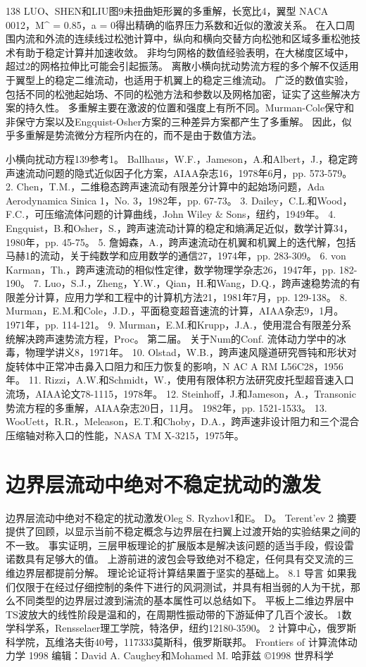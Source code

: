 \documentclass[UTF8,11pt,a4paper,openany,fontset=fandol]{ctexbook}
\begin{document}
138 LUO、SHEN和LIU图9未扭曲矩形翼的多重解，长宽比4，翼型 NACA 0012，M\textasciicircum{} = 0.85，a = 0得出精确的临界压力系数和近似的激波关系。 在入口周围内流和外流的连续线过松弛计算中，纵向和横向交替方向松弛和区域多重松弛技术有助于稳定计算并加速收敛。 非均匀网格的数值经验表明，在大梯度区域中，超过2的网格拉伸比可能会引起振荡。 离散小横向扰动势流方程的多个解不仅适用于翼型上的稳定二维流动，也适用于机翼上的稳定三维流动。 广泛的数值实验，包括不同的松弛起始场、不同的松弛方法和参数以及网格加密，证实了这些解决方案的持久性。 多重解主要在激波的位置和强度上有所不同。Murman-Cole保守和非保守方案以及Engquist-Osher方案的三种差异方案都产生了多重解。 因此，似乎多重解是势流微分方程所内在的，而不是由于数值方法。

小横向扰动方程139参考1。 Ballhaus，W.F.，Jameson，A.和Albert，J.，稳定跨声速流动问题的隐式近似因子化方案，AIAA杂志16，1978年6月，pp. 573-579。 2. Chen，T.M.，二维稳态跨声速流动有限差分计算中的起始场问题，Ada Aerodynamica Sinica 1，No. 3，1982年，pp. 67-73。 3. Dailey，C.L.和Wood，F.C.，可压缩流体问题的计算曲线，John Wiley \& Sons，纽约，1949年。 4. Engquist，B.和Osher，S.，跨声速流动计算的稳定和熵满足近似，数学计算34，1980年，pp. 45-75。 5. 詹姆森，A.，跨声速流动在机翼和机翼上的迭代解，包括马赫1的流动，关于纯数学和应用数学的通信27，1974年，pp. 283-309。 6. von Karman，Th.，跨声速流动的相似性定律，数学物理学杂志26，1947年，pp. 182-190。 7. Luo，S.J.，Zheng，Y.W.，Qian，H.和Wang，D.Q.，跨声速稳势流的有限差分计算，应用力学和工程中的计算机方法21，1981年7月，pp. 129-138。 8. Murman，E.M.和Cole，J.D.，平面稳变超音速流的计算，AIAA杂志9，1月。 1971年，pp. 114-121。 9. Murman，E.M.和Krupp，J.A.，使用混合有限差分系统解决跨声速势流方程，Proc。 第二届。 关于Num的Conf. 流体动力学中的冰毒，物理学讲义8，1971年。 10. Olstad，W.B.，跨声速风隧道研究唇钝和形状对旋转体中正常冲击鼻入口阻力和压力恢复的影响，N AC A RM L56C28，1956年。 11. Rizzi，A.W.和Schmidt，W.，使用有限体积方法研究皮托型超音速入口流场，AIAA论文78-1115，1978年。 12. Steinhoff，J.和Jameson，A.，Transonic 势流方程的多重解，AIAA杂志20日，11月。 1982年，pp. 1521-1533。 13. WooUett，R.R.，Meleason，E.T.和Choby，D.A.，跨声速非设计阻力和三个混合压缩轴对称入口的性能，NASA TM X-3215，1975年。

\clearpage
\chapter{边界层流动中绝对不稳定扰动的激发}
边界层流动中绝对不稳定的扰动激发Oleg S. Ryzhov1和E。 D。 Terent'ev 2 摘要 提供了回顾，以显示当前不稳定概念与边界层在扫翼上过渡开始的实验结果之间的不一致。 事实证明，三层甲板理论的扩展版本是解决该问题的适当手段，假设雷诺数具有足够大的值。 上游前进的波包会导致绝对不稳定，任何具有交叉流的三维边界层都提前分解。 理论论证将计算结果置于坚实的基础上。 8.1 导言 如果我们仅限于在经过仔细控制的条件下进行的风洞测试，并具有相当弱的人为干扰，那么不同类型的边界层过渡到湍流的基本属性可以总结如下。 平板上二维边界层中TS波放大的线性阶段是温和的，在周期性振动带的下游延伸了几百个波长。 1数学科学系，Rensselaer理工学院，特洛伊，纽约12180-3590。 2 计算中心，俄罗斯科学院，瓦维洛夫街40号，117333莫斯科，俄罗斯联邦。 Frontiers of 计算流体动力学 1998 编辑：David A. Caughey和Mohamed M. 哈菲兹 ©1998 世界科学
\end{document}
